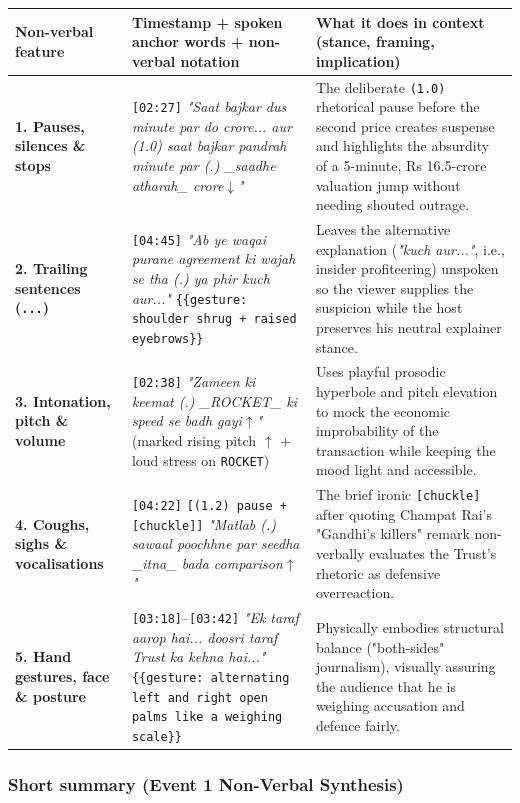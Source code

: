 \documentclass[10pt,a4paper]{article}
\begin{document}
\begin{longtable}{|p{}|p{}|p{}|}
\hline
Non-verbal feature & Timestamp + spoken anchor words + non-verbal notation & What it does in context (stance, framing, implication) \\ \hline \endhead
\textbf{1. Pauses, silences \& stops} & \texttt{[02:27]} \textit{"Saat bajkar dus minute par do crore... aur (1.0) saat bajkar pandrah minute par (.) \_saadhe atharah\_ crore$\downarrow$"} & The deliberate \texttt{(1.0)} rhetorical pause before the second price creates suspense and highlights the absurdity of a 5-minute, Rs 16.5-crore valuation jump without needing shouted outrage. \\ \hline
\textbf{2. Trailing sentences (\texttt{...})} & \texttt{[04:45]} \textit{"Ab ye waqai purane agreement ki wajah se tha (.) ya phir kuch aur..."} \texttt{\{\{gesture: shoulder shrug + raised eyebrows\}\}} & Leaves the alternative explanation (\textit{"kuch aur..."}, i.e., insider profiteering) unspoken so the viewer supplies the suspicion while the host preserves his neutral explainer stance. \\ \hline
\textbf{3. Intonation, pitch \& volume} & \texttt{[02:38]} \textit{"Zameen ki keemat (.) \_ROCKET\_ ki speed se badh gayi$\uparrow$"} (marked rising pitch \texttt{$\uparrow$} + loud stress on \texttt{ROCKET}) & Uses playful prosodic hyperbole and pitch elevation to mock the economic improbability of the transaction while keeping the mood light and accessible. \\ \hline
\textbf{4. Coughs, sighs \& vocalisations} & \texttt{[04:22]} \texttt{[(1.2) pause + [chuckle]]} \textit{"Matlab (.) sawaal poochhne par seedha \_itna\_ bada comparison$\uparrow$"} & The brief ironic \texttt{[chuckle]} after quoting Champat Rai's "Gandhi's killers" remark non-verbally evaluates the Trust's rhetoric as defensive overreaction. \\ \hline
\textbf{5. Hand gestures, face \& posture} & \texttt{[03:18]}--\texttt{[03:42]} \textit{"Ek taraf aarop hai... doosri taraf Trust ka kehna hai..."} \texttt{\{\{gesture: alternating left and right open palms like a weighing scale\}\}} & Physically embodies structural balance ("both-sides" journalism), visually assuring the audience that he is weighing accusation and defence fairly. \\ \hline
\end{longtable}

\subsubsection*{Short summary (Event 1 Non-Verbal Synthesis)}
\end{document}
